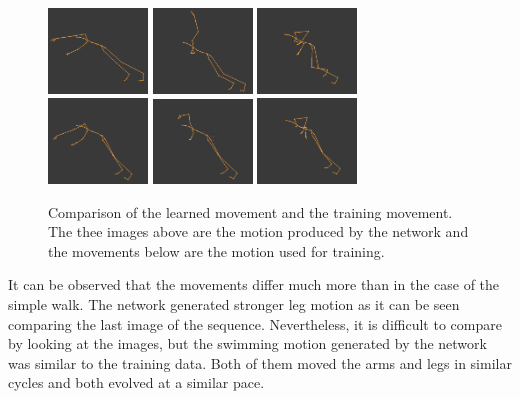 \documentclass[letterpaper,9pt]{article}
\begin{document}
\begin{figure}[h!]
  \centering
  \includegraphics[width=100px]{Extra/out_swim_1.png}
  \includegraphics[width=100px]{Extra/out_swim_2.png}
  \includegraphics[width=100px]{Extra/out_swim_3.png}\\
  \includegraphics[width=100px]{Extra/teach_swim_1.png}
  \includegraphics[width=100px]{Extra/teach_swim_2.png}
  \includegraphics[width=100px]{Extra/teach_swim_3.png}
    \caption[Swimming]{Comparison of the learned movement and the training movement. The thee images above are the motion produced by the network and the movements below are the motion used for training.}
\end{figure}

It can be observed that the movements differ much more than in the case of the simple walk. The network generated stronger leg motion as it can be seen comparing the last image of the sequence. Nevertheless, it is difficult to compare by looking at the images, but the swimming motion generated by the network was similar to the training data. Both of them moved the arms and legs in similar cycles and both evolved at a similar pace. 
\end{document}
